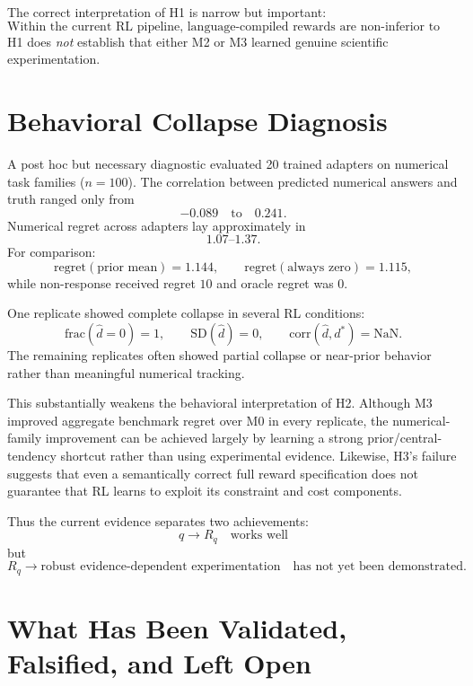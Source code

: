 \documentclass[11pt]{article}
\begin{document}
The correct interpretation of H1 is narrow but important:
\[
\boxed{
\text{Within the current RL pipeline, language-compiled rewards are non-inferior to manually specified rewards under the preregistered margin.}
}
\]
H1 does \emph{not} establish that either M2 or M3 learned genuine scientific experimentation.

\section{Behavioral Collapse Diagnosis}
A post hoc but necessary diagnostic evaluated 20 trained adapters on numerical task families ($n=100$). The correlation between predicted numerical answers and truth ranged only from
\[
-0.089\quad\text{to}\quad0.241.
\]
Numerical regret across adapters lay approximately in
\[
1.07\text{--}1.37.
\]
For comparison:
\[
\mathrm{regret}(\text{prior mean})=1.144,
\qquad
\mathrm{regret}(\text{always zero})=1.115,
\]
while non-response received regret $10$ and oracle regret was $0$.

One replicate showed complete collapse in several RL conditions:
\[
\mathrm{frac}(\widehat d=0)=1,
\qquad
\mathrm{SD}(\widehat d)=0,
\qquad
\mathrm{corr}(\widehat d,d^*)=\mathrm{NaN}.
\]
The remaining replicates often showed partial collapse or near-prior behavior rather than meaningful numerical tracking.

This substantially weakens the behavioral interpretation of H2. Although M3 improved aggregate benchmark regret over M0 in every replicate, the numerical-family improvement can be achieved largely by learning a strong prior/central-tendency shortcut rather than using experimental evidence. Likewise, H3's failure suggests that even a semantically correct full reward specification does not guarantee that RL learns to exploit its constraint and cost components.

Thus the current evidence separates two achievements:
\[
\boxed{q\rightarrow R_q\quad\text{works well}}
\]
but
\[
\boxed{R_q\rightarrow\text{robust evidence-dependent experimentation}\quad\text{has not yet been demonstrated}.}
\]

\section{What Has Been Validated, Falsified, and Left Open}
\end{document}
